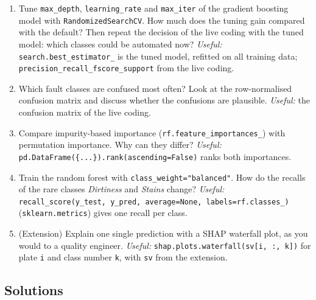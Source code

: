 \documentclass[
  letterpaper,
  DIV=11,
  numbers=noendperiod]{scrreprt}
\providecommand{\tightlist}{%
  \setlength{\itemsep}{0pt}\setlength{\parskip}{0pt}}\usepackage{longtable,booktabs,array}
\begin{document}
\begin{enumerate}
\def\labelenumi{\arabic{enumi}.}
\tightlist
\item
  Tune \texttt{max\_depth}, \texttt{learning\_rate} and
  \texttt{max\_iter} of the gradient boosting model with
  \texttt{RandomizedSearchCV}. How much does the tuning gain compared
  with the default? Then repeat the decision of the live coding with the
  tuned model: which classes could be automated now? \emph{Useful:}
  \texttt{search.best\_estimator\_} is the tuned model, refitted on all
  training data; \texttt{precision\_recall\_fscore\_support} from the
  live coding.
\item
  Which fault classes are confused most often? Look at the
  row-normalised confusion matrix and discuss whether the confusions are
  plausible. \emph{Useful:} the confusion matrix of the live coding.
\item
  Compare impurity-based importance (\texttt{rf.feature\_importances\_})
  with permutation importance. Why can they differ? \emph{Useful:}
  \texttt{pd.DataFrame(\{...\}).rank(ascending=False)} ranks both
  importances.
\item
  Train the random forest with \texttt{class\_weight="balanced"}. How do
  the recalls of the rare classes \emph{Dirtiness} and \emph{Stains}
  change? \emph{Useful:}
  \texttt{recall\_score(y\_test,\ y\_pred,\ average=None,\ labels=rf.classes\_)}
  (\texttt{sklearn.metrics}) gives one recall per class.
\item
  (Extension) Explain one single prediction with a SHAP waterfall plot,
  as you would to a quality engineer. \emph{Useful:}
  \texttt{shap.plots.waterfall(sv{[}i,\ :,\ k{]})} for plate \texttt{i}
  and class number \texttt{k}, with \texttt{sv} from the extension.
\end{enumerate}

\subsection{Solutions}\label{solutions-8}
\end{document}
